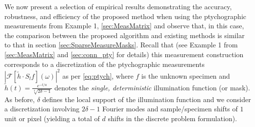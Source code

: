 { We now present a selection of empirical results demonstrating the accuracy, robustness, and efficiency of the proposed method when using the ptychographic measurements from Example 1, \cref{sec:MeasMatrix} and observe that, in this case, the comparison between the proposed algorithm and existing methods is similar to that in section \cref{sec:SparseMeasureMasks}.}  Recall that (see Example 1 from \cref{sec:MeasMatrix} and \cref{sec:conn_pty} for details) this measurement construction corresponds to a discretization of the ptychographic measurements $\left|\mathcal{F}[\widetilde h \cdot S_l f](\omega) \right|^2$ as per \eqref{eq:ptych}, where $f$ is the unknown specimen and $\widetilde h(t) = \frac{e^{-t/a}}{\sqrt[4]{2\delta -1}}$ denotes the {\em single, deterministic} illumination function (or mask). As before, $\delta$ defines the local support of the illumination function and we consider a discretization involving $2\delta-1$ Fourier modes and sample/specimen shifts of $1$ unit or pixel (yielding a total of $d$ shifts in the discrete problem formulation). 

